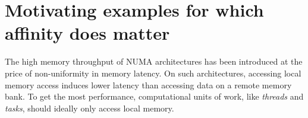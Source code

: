 \documentclass{Styles/llncs}
\begin{document}
%

\section{Motivating examples for which affinity does matter}
\label{sec:motivation}

The high memory throughput  of NUMA architectures has been introduced at the price of non-uniformity in memory latency. On such architectures, accessing local memory access induces lower latency than accessing data on a remote memory bank. To get the most performance, computational units of work, like \emph{threads} and \emph{tasks}, should ideally only access local memory.
\end{document}
